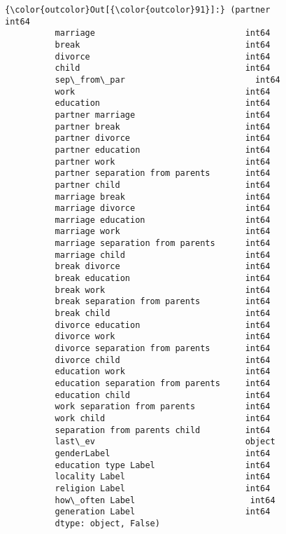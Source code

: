 \documentclass[11pt]{article}
\begin{document}
\begin{Verbatim}[commandchars=\\\{\}]
{\color{outcolor}Out[{\color{outcolor}91}]:} (partner                               int64
          marriage                              int64
          break                                 int64
          divorce                               int64
          child                                 int64
          sep\_from\_par                          int64
          work                                  int64
          education                             int64
          partner marriage                      int64
          partner break                         int64
          partner divorce                       int64
          partner education                     int64
          partner work                          int64
          partner separation from parents       int64
          partner child                         int64
          marriage break                        int64
          marriage divorce                      int64
          marriage education                    int64
          marriage work                         int64
          marriage separation from parents      int64
          marriage child                        int64
          break divorce                         int64
          break education                       int64
          break work                            int64
          break separation from parents         int64
          break child                           int64
          divorce education                     int64
          divorce work                          int64
          divorce separation from parents       int64
          divorce child                         int64
          education work                        int64
          education separation from parents     int64
          education child                       int64
          work separation from parents          int64
          work child                            int64
          separation from parents child         int64
          last\_ev                              object
          genderLabel                           int64
          education type Label                  int64
          locality Label                        int64
          religion Label                        int64
          how\_often Label                       int64
          generation Label                      int64
          dtype: object, False)
\end{Verbatim}
            
\end{document}
